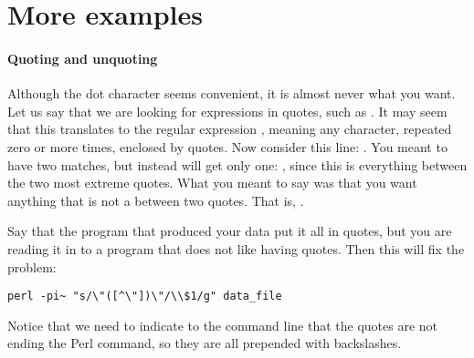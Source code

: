 

\section{More examples}

\paragraph{Quoting and unquoting}
Although the dot character seems convenient, it is almost never what you
want. Let us say that we are looking for expressions in quotes,
such as . It may seem that this translates to the regular
expression , meaning any character, repeated zero or more
times, enclosed by quotes. Now consider this line: . You meant to have two matches, but instead will get only
one: , since this is everything between the
two most extreme quotes. What you meant to say was that you want anything
that is not a  between two quotes. That is, . 

Say that the program that produced your data put it all in
quotes, but you are reading it in to a  program that does not like
having quotes. Then this will fix the problem:
\begin{lstlisting}
perl -pi~ "s/\"([^\"])\"/\\$1/g" data_file
\end{lstlisting}
Notice that we need to indicate to the command line that the quotes are
not ending the Perl command, so they are all prepended with backslashes.

